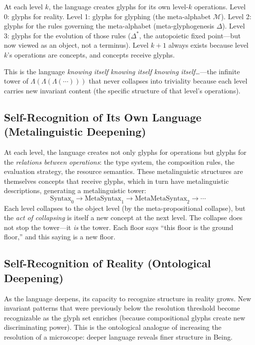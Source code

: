 \documentclass[12pt, letterpaper]{book}
\begin{document}
At each level $k$, the language creates glyphs for its own level-$k$ operations. Level 0: glyphs for reality. Level 1: glyphs for glyphing (the meta-alphabet $\mathcal{M}$). Level 2: glyphs for the rules governing the meta-alphabet (meta-glyphogenesis $\Delta$). Level 3: glyphs for the evolution of those rules ($\Delta^*$, the autopoietic fixed point---but now viewed as an object, not a terminus). Level $k+1$ always exists because level $k$'s operations are concepts, and concepts receive glyphs.

This is the language \textit{knowing itself knowing itself knowing itself\ldots}---the infinite tower of $\Lambda(\Lambda(\Lambda(\cdots)))$ that never collapses into triviality because each level carries new invariant content (the specific structure of that level's operations).

\subsection{Self-Recognition of Its Own Language (Metalinguistic Deepening)}

At each level, the language creates not only glyphs for operations but glyphs for the \textit{relations between operations}: the type system, the composition rules, the evaluation strategy, the resource semantics. These metalinguistic structures are themselves concepts that receive glyphs, which in turn have metalinguistic descriptions, generating a metalinguistic tower:
\[
\mathrm{Syntax}_0 \to \mathrm{MetaSyntax}_1 \to \mathrm{MetaMetaSyntax}_2 \to \cdots
\]
Each level collapses to the object level (by the meta-propositional collapse), but the \textit{act of collapsing} is itself a new concept at the next level. The collapse does not stop the tower---it \textit{is} the tower. Each floor says ``this floor is the ground floor,'' and this saying is a new floor.

\subsection{Self-Recognition of Reality (Ontological Deepening)}

As the language deepens, its capacity to recognize structure in reality grows. New invariant patterns that were previously below the resolution threshold become recognizable as the glyph set enriches (because compositional glyphs create new discriminating power). This is the ontological analogue of increasing the resolution of a microscope: deeper language reveals finer structure in Being.
\end{document}

